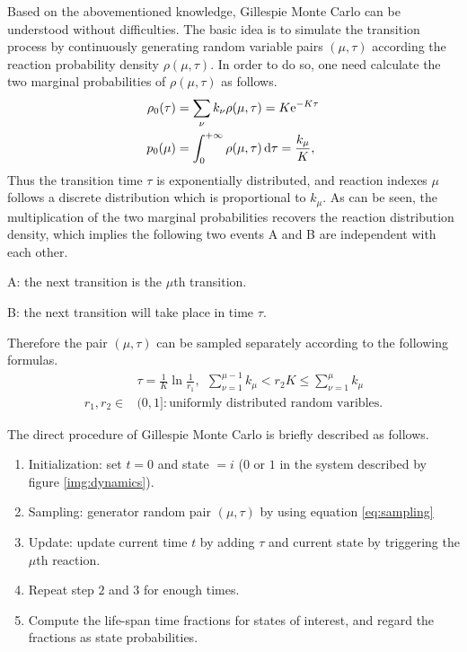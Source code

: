 		Based on the abovementioned knowledge, Gillespie Monte Carlo can be understood without difficulties. The basic idea is to simulate the transition process by continuously generating random variable pairs $(\mu, \tau)$ according the reaction probability density $\rho(\mu,\tau)$. In order to do so, one need calculate the two marginal probabilities of $\rho(\mu,\tau)$ as follows.
		\begin{equation}
			\begin{aligned}
				\rho_0(\tau) &= \sum_\nu k_\nu \rho(\mu,\tau) = K\mathrm{e}^{-K\tau}\\
				p_0(\mu) &= \int_0^{+\infty}\rho(\mu,\tau)\operatorname{d\!} \tau = \frac{k_\mu}{K},
			\end{aligned}
			\label{eq: marginal_distribution}
		\end{equation}
		Thus the transition time $\tau$ is exponentially distributed, and reaction indexes $\mu$ follows a discrete distribution which is proportional to $k_\mu$. As can be seen, the multiplication of the two marginal probabilities recovers the reaction distribution density, which implies the following two events A and B are independent with each other.
		\begin{description}
			\item A: the next transition is the $\mu$th transition.
			\item B: the next transition will take place in time $\tau$.
		\end{description}
		Therefore the pair $(\mu, \tau)$ can be sampled separately according to the following formulas.
		\begin{equation}
			\begin{aligned}
			&\tau = \frac{1}{K}\ln{\frac{1}{r_1}}, \ \ 
			\sum_{\nu=1}^{\mu-1} k_\mu <r_2K \le \sum_{\nu=1}^{\mu} k_\mu\\
			r_1,r_2 \in &(0,1]: \text{uniformly distributed random varibles.}
			\end{aligned}
			\label{eq:sampling}
		\end{equation}

		The direct procedure of Gillespie Monte Carlo is briefly described as follows.
		\begin{enumerate}
			\item Initialization: set $t = 0$ and state $=i$ ($0$ or $1$ in the system described by figure \ref{img:dynamics}).
			\item Sampling: generator random pair $(\mu, \tau)$ by using equation \eqref{eq:sampling}
			\item Update: update current time $t$ by adding $\tau$ and current state by triggering the $\mu$th reaction.
			\item Repeat step $2$ and $3$ for enough times.
			\item Compute the life-span time fractions for states of interest, and regard the fractions as state probabilities.
		\end{enumerate}

